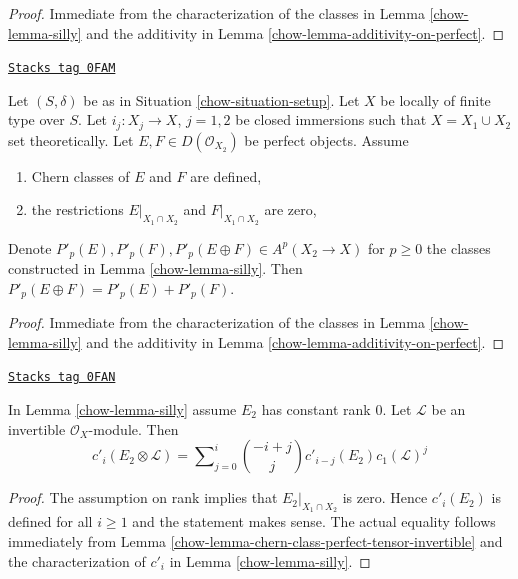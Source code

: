\begin{proof}

Immediate from the characterization of the classes in
Lemma \ref{chow-lemma-silly} and the additivity in
Lemma \ref{chow-lemma-additivity-on-perfect}.
\end{proof}

\begin{lemma}
\label{chow-lemma-silly-sum-P}
\href{https://stacks.math.columbia.edu/tag/0FAM}{\texttt{Stacks tag 0FAM}}

Let $(S, \delta)$ be as in Situation \ref{chow-situation-setup}. Let $X$ be
locally of finite type over $S$. Let $i_j : X_j \to X$, $j = 1, 2$
be closed immersions such that $X = X_1 \cup X_2$ set theoretically. Let
$E, F \in D(\mathcal{O}_{X_2})$ be perfect objects. Assume
\begin{enumerate}
\item Chern classes of $E$ and $F$ are defined,
\item the restrictions $E|_{X_1 \cap X_2}$ and $F|_{X_1 \cap X_2}$ are zero,
\end{enumerate}
Denote $P'_p(E), P'_p(F), P'_p(E \oplus F) \in A^p(X_2 \to X)$ for $p \geq 0$
the classes constructed in Lemma \ref{chow-lemma-silly}. Then
$P'_p(E \oplus F) = P'_p(E) + P'_p(F)$.
\end{lemma}

\begin{proof}

Immediate from the characterization of the classes in
Lemma \ref{chow-lemma-silly} and the additivity in
Lemma \ref{chow-lemma-additivity-on-perfect}.
\end{proof}

\begin{lemma}
\label{chow-lemma-silly-tensor-invertible}
\href{https://stacks.math.columbia.edu/tag/0FAN}{\texttt{Stacks tag 0FAN}}

In Lemma \ref{chow-lemma-silly} assume $E_2$ has constant rank $0$.
Let $\mathcal{L}$ be an invertible $\mathcal{O}_X$-module. Then
$$
c'_i(E_2 \otimes \mathcal{L}) =
\sum\nolimits_{j = 0}^i
\binom{- i + j}{j} c'_{i - j}(E_2) c_1(\mathcal{L})^j
$$
\end{lemma}

\begin{proof}

The assumption on rank implies that $E_2|_{X_1 \cap X_2}$ is zero.
Hence $c'_i(E_2)$ is defined for all $i \geq 1$ and the statement
makes sense. The actual equality follows
immediately from Lemma \ref{chow-lemma-chern-class-perfect-tensor-invertible}
and the characterization of $c'_i$ in Lemma \ref{chow-lemma-silly}.
\end{proof}

